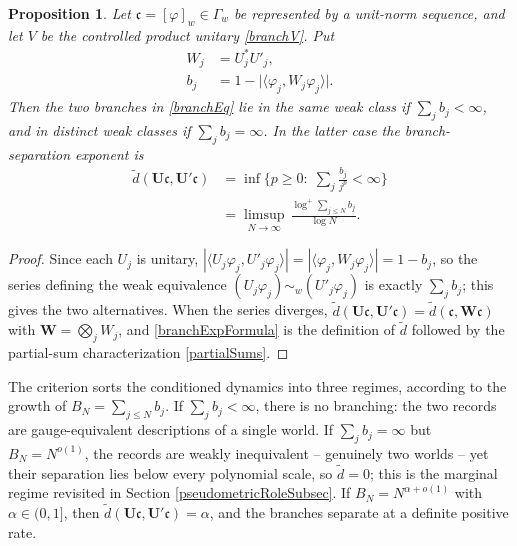 \documentclass[twoside,11pt,letter]{article}
\def\fc{{\mathfrak{c}}}
\theoremstyle{definition}
\theoremstyle{definition}
\theoremstyle{plain}
\newtheorem{proposition}[theorem]{Proposition}
\begin{document}
\begin{proposition}\label{branchingCriterionProp}
Let $\fc=[\varphi]_w\in\Gamma_w$ be represented by a unit-norm sequence, and let $V$ be the controlled product unitary \eqref{branchV}. Put
\begin{equation}\label{branchDefect}
\begin{split}
W_j&=U_j^\ast U'_j,\\
b_j&=1-\big|\langle\varphi_j,W_j\varphi_j\rangle\big|.
\end{split}
\end{equation}
Then the two branches in \eqref{branchEq} lie in the same weak class if $\sum_j b_j<\infty$, and in distinct weak classes if $\sum_j b_j=\infty$. In the latter case the branch-separation exponent is
\begin{equation}\label{branchExpFormula}
\begin{split}
\tilde d(\mathbf{U}\fc,\mathbf{U}'\fc)
&=\inf\Big\{p\geq 0:\;\sum_j \frac{b_j}{j^p}<\infty\Big\}\\
&=\limsup_{N\to\infty}\,\frac{\log^+\sum_{j\leq N}b_j}{\log N}.
\end{split}
\end{equation}
\end{proposition}
\begin{proof}
Since each $U_j$ is unitary, $|\langle U_j\varphi_j,U'_j\varphi_j\rangle|=|\langle\varphi_j,W_j\varphi_j\rangle|=1-b_j$, so the series defining the weak equivalence $(U_j\varphi_j)\sim_w(U'_j\varphi_j)$ is exactly $\sum_j b_j$; this gives the two alternatives. When the series diverges, $\tilde d(\mathbf{U}\fc,\mathbf{U}'\fc)=\tilde d(\fc,\mathbf{W}\fc)$ with $\mathbf{W}=\bigotimes_j W_j$, and \eqref{branchExpFormula} is the definition of $\tilde d$ followed by the partial-sum characterization \eqref{partialSums}.
\end{proof}

The criterion sorts the conditioned dynamics into three regimes, according to the growth of $B_N=\sum_{j\leq N}b_j$. If $\sum_j b_j<\infty$, there is no branching: the two records are gauge-equivalent descriptions of a single world. If $\sum_j b_j=\infty$ but $B_N=N^{o(1)}$, the records are weakly inequivalent -- genuinely two worlds -- yet their separation lies below every polynomial scale, so $\tilde d=0$; this is the marginal regime revisited in Section \ref{pseudometricRoleSubsec}. If $B_N=N^{\alpha+o(1)}$ with $\alpha\in(0,1]$, then $\tilde d(\mathbf{U}\fc,\mathbf{U}'\fc)=\alpha$, and the branches separate at a definite positive rate.
\end{document}
